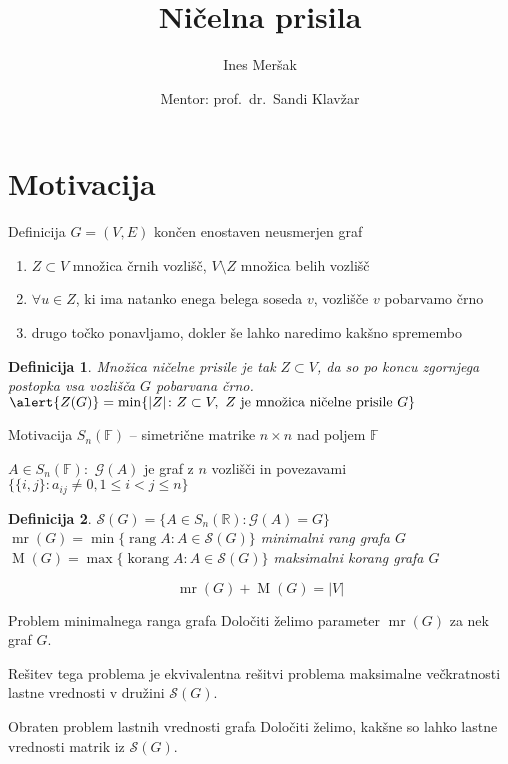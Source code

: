 \documentclass{beamer}
\title[Ničelna prisila]{Ničelna prisila}
\author{Ines Meršak}
\date[13.~april 2018]{Mentor: prof.~dr.~Sandi Klavžar}
\newtheorem{definicija}{Definicija}
\newcommand{\R}{\ensuremath{\mathbb{R}}}
\newcommand{\F}{\ensuremath{\mathbb{F}}}
\DeclareMathOperator{\rang}{rang}
\DeclareMathOperator{\korang}{korang}
\DeclareMathOperator{\mr}{mr}
\DeclareMathOperator{\M}{M}
\begin{document}
\frame{\titlepage}

\section{Motivacija}
\begin{frame}[fragile]{Definicija}
    $ G = (V,E)$ končen enostaven neusmerjen graf

    \medskip
    
    \begin{enumerate}
        \item $Z \subset V$ množica črnih vozlišč, $V \setminus Z$ množica belih vozlišč
        \item $\forall u \in Z$, ki ima natanko enega belega soseda $v$, vozlišče $v$ pobarvamo črno
        \item drugo točko ponavljamo, dokler še lahko naredimo kakšno spremembo
    \end{enumerate}
    \begin{definicija}
        \alert{Množica ničelne prisile} je tak $Z \subset V$, da so po koncu zgornjega postopka vsa vozlišča $G$ pobarvana črno.
        $\alert{Z(G)} = \min \{|Z|\colon Z \subset V ,\ Z\text{ je množica ničelne prisile }G \} $
    \end{definicija}
\end{frame}

\begin{frame}{Motivacija}
    $S_n(\F)$ -- simetrične matrike $n\times n$ nad poljem $\F$
    
    \medskip
    
    $A \in S_n(\F) \colon$
    $\mathcal{G}(A)$ je graf z $n$ vozlišči in povezavami $\{\{i,j\}\colon a_{ij} \neq 0, 1 \leq i < j \leq n \} $
    
    \medskip
    \begin{definicija}
        $\mathcal{S}(G) = \{ A \in S_n(\R)\colon \mathcal{G}(A) = G \} $ \\
        $\mr(G) = \min \{ \rang A \colon A \in \mathcal{S}(G) \}$ \alert{minimalni rang} grafa $G$
        $\M(G) = \max \{ \korang A \colon A \in \mathcal{S}(G) \}$ \alert{maksimalni korang} grafa $G$
    \end{definicija}
    
    \[ \mr(G) + \M(G) = |V| \]
\end{frame}

\begin{frame}
    \begin{block}{Problem minimalnega ranga grafa}
        Določiti želimo parameter $\mr(G)$ za nek graf $G$.
    \end{block}
    
    \bigskip
    
    Rešitev tega problema je ekvivalentna rešitvi problema maksimalne večkratnosti lastne vrednosti v družini $\mathcal{S}(G)$.
    
    \bigskip
    
    \begin{block}{Obraten problem lastnih vrednosti grafa}
        Določiti želimo, kakšne so lahko lastne vrednosti matrik iz $\mathcal{S}(G)$.
    \end{block}
\end{frame}
\end{document}
